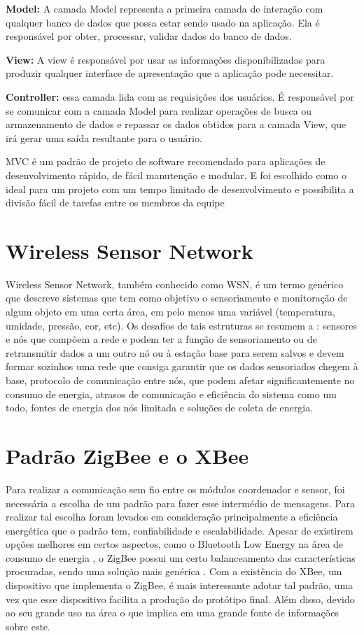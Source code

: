 \textbf{Model:} A camada Model representa a primeira camada de interação com qualquer banco de dados que possa estar sendo usado na aplicação. Ela é responsável por obter, processar, validar dados do banco de dados.

\textbf{View:} A view é responsável por usar as informações disponibilizadas para produzir qualquer interface de apresentação que a aplicação pode necessitar.

\textbf{Controller:} essa camada lida com as requisições dos usuários. É responsável por se comunicar com a camada Model para realizar operações de busca ou armazenamento de dados e repassar os dados obtidos para a camada View, que irá gerar uma saída resultante para o usuário.

MVC é um padrão de projeto de software recomendado para aplicações de desenvolvimento rápido, de fácil manutenção e modular. E foi escolhido como o ideal para um projeto com um tempo limitado de desenvolvimento e possibilita a divisão fácil de tarefas entre os membros da equipe

\section{Wireless Sensor Network }
\label{Sec:WSN}
Wireless Sensor Network, também conhecido como WSN, é um termo genérico que descreve sistemas que tem como objetivo o sensoriamento e monitoração de algum objeto em uma certa área, em pelo menos uma variável (temperatura, umidade, pressão, cor, etc). Os desafios de tais estruturas se resumem a \cite{WSN_survey_JYBMDG_article}: sensores e nós que compõem a rede e podem ter a função de sensoriamento ou de retransmitir dados a um outro nó ou à estação base para serem salvos e devem formar sozinhos uma rede que consiga garantir que os dados sensoriados chegem à base, protocolo de comunicação entre nós, que podem afetar significantemente no consumo de energia, atrasos de comunicação e eficiência do sistema como um todo, fontes de energia dos nós limitada e soluções de coleta de energia. 

\section{Padrão ZigBee e o XBee}
\label{Sec:ZigBee_XBee}
 Para realizar a comunicação sem fio entre os módulos coordenador e sensor, foi necessária a escolha de um padrão para fazer esse intermédio de mensagens. Para realizar tal escolha foram levados em consideração principalmente a eficiência energética que o padrão tem, confiabilidade e escalabilidade. Apesar de existirem opções melhores em certos aspectos, como o Bluetooth Low Energy na área de consumo de energia \cite{BLE_MHABAL}, o ZigBee possui um certo balanceamento das características procuradas, sendo uma solução mais genérica \cite{CG_JP_survey}. Com a existência do XBee, um dispositivo que implementa o ZigBee, é mais interessante adotar tal padrão, uma vez que esse dispositivo facilita a produção do protótipo final.  Além disso, devido ao seu grande uso na área o que implica em uma grande fonte de informações sobre este\cite{xbee_book}\cite{sensor_network_book}\cite{low_cost_wireless_sensor_network_SMF_master_thesis}.

